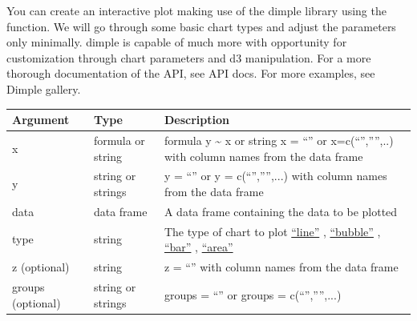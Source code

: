 \documentclass[letterpaper,10pt,english]{sphinxmanual}
\begin{document}
You can create an interactive plot making use of the dimple library using the  function.  We will go through some basic chart types and adjust the parameters only minimally.  dimple is capable of much more with opportunity for customization through chart parameters and d3 manipulation.  For a more thorough documentation of the API, see API docs.  For more examples, see Dimple gallery.

\begin{tabulary}{\linewidth}{|L|L|L|}
\hline
\textsf{\relax 
Argument
} & \textsf{\relax 
Type
} & \textsf{\relax 
Description
}\\
\hline
x
 & 
formula or string
 & 
formula y \textasciitilde{} x or string x = ``'' or x=c(``'','''',..) with column names from the data frame
\\

y
 & 
string or strings
 & 
y = ``'' or y = c(``'','''',...) with column names from the data frame
\\

data
 & 
data frame
 & 
A data frame containing the data to be plotted
\\

type
 & 
string
 & 
The type of chart to plot \href{https://github.com/PMSI-AlignAlytics/dimple/wiki/dimple.plot\#line}{``line''} , \href{https://github.com/PMSI-AlignAlytics/dimple/wiki/dimple.plot\#bubble}{``bubble''} , \href{https://github.com/PMSI-AlignAlytics/dimple/wiki/dimple.plot\#bar}{``bar''} , \href{https://github.com/PMSI-AlignAlytics/dimple/wiki/dimple.plot\#area}{``area''}
\\

z (optional)
 & 
string
 & 
z = ``'' with column names from the data frame
\\

groups (optional)
 & 
string or strings
 & 
groups = ``'' or groups = c(``'','''',...)
\\
\hline\end{tabulary}
\end{document}
